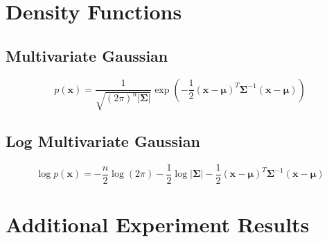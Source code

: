 \chapter{Density Functions}

\section{Multivariate Gaussian}

\begin{equation}
    p(\mathbf{x}) = \frac{1}{\sqrt{(2\pi)^n |\boldsymbol{\Sigma}|}} \exp\left(-\frac{1}{2} (\mathbf{x} - \boldsymbol{\mu})^T \boldsymbol{\Sigma}^{-1} (\mathbf{x} - \boldsymbol{\mu})\right)
    \label{eq:mvn}
\end{equation}

\section{Log Multivariate Gaussian}

\begin{equation}
    \log p(\mathbf{x}) = -\frac{n}{2} \log(2\pi) - \frac{1}{2} \log |\boldsymbol{\Sigma}| - \frac{1}{2} (\mathbf{x} - \boldsymbol{\mu})^T \boldsymbol{\Sigma}^{-1} (\mathbf{x} - \boldsymbol{\mu})
    \label{eq:log_mvn}
\end{equation}


\chapter{Additional Experiment Results}



